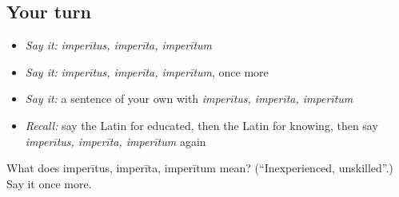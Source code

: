 \subsection*{Your turn}
\begin{itemize}
\raggedright
  \item \emph{Say it:} \emph{imperītus, imperīta, imperītum}
  \item \emph{Say it:} \emph{imperītus, imperīta, imperītum}, once more
  \item \emph{Say it:} a sentence of your own with \emph{imperītus, imperīta, imperītum}
  \item \emph{Recall:} say the Latin for educated, then the Latin for knowing, then say \emph{imperītus, imperīta, imperītum} again
\end{itemize}

\begin{tcolorbox}[breakable,colback=teal!4,colframe=teal!35!black,title={Before you move on}]
What does imperītus, imperīta, imperītum mean? (\textquotedblleft{}Inexperienced, unskilled\textquotedblright{}.) Say it once more.
\end{tcolorbox}
